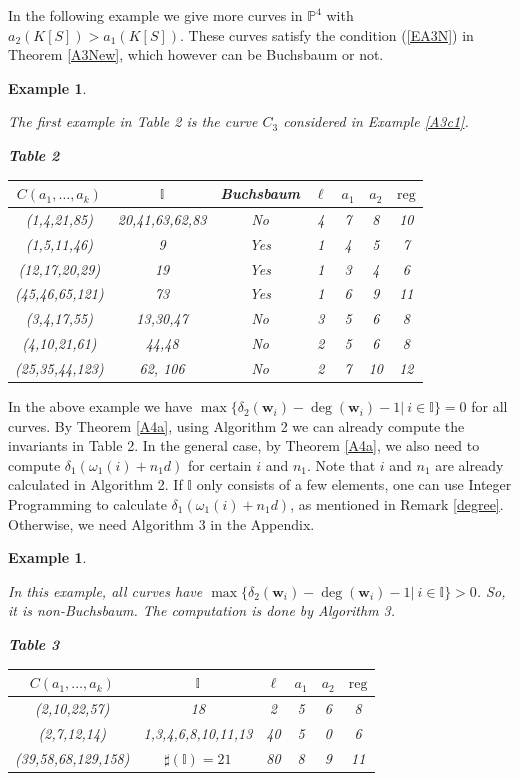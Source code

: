 \documentclass[11pt]{article}
\newtheorem{Example}[Theorem]{Example}
\def\deg{\operatorname{deg}}
\def\reg{\mathrm{reg}}
\def\wbf{{\mathbf w}}
\def\Pset{{\mathbb P}}
\def\Iset{{\mathbb I}}
\theoremstyle{remark}
\theoremstyle{definition}
\begin{document}
In the following example we give more curves in $\Pset^4$ with $ a_2(K[S]) > a_1(K[S])  $. These curves satisfy the condition (\ref{EA3N}) in Theorem \ref{A3New}, which  however can be  Buchsbaum or not.

\begin{Example} \label{ExAl2} {\rm 
The first example in Table 2 is the curve $C_3$ considered in Example \ref{A3c1}.

\centering \textbf{Table 2}
\begin{center} 

    \begin{tabular}{|c|c|c|c|c|c|c|}
\hline
$C(a_1,\ldots,a_k)$ & $\Iset$ & Buchsbaum& $\ell$ & $a_1$ & $a_2$ &$\reg$ \\
\hline
(1,4,21,85) & 20,41,63,62,83& No & 4 & 7 & 8 &10\\
(1,5,11,46)& 9 & Yes & 1 & 4 & 5 & 7\\
(12,17,20,29) & 19& Yes & 1& 3 & 4 & 6\\
(45,46,65,121)& 73&  Yes& 1 & 6 & 9 & 11\\
(3,4,17,55) & 13,30,47 & No & 3 & 5 & 6 & 8\\
(4,10,21,61) & 44,48 & No &  2 & 5 & 6 & 8\\
(25,35,44,123) & 62, 106& No & 2 & 7 & 10 & 12\\
\hline
\end{tabular}
\end{center}
 }
 \end{Example}

In the above example we have $ \max\{ \delta_2(\wbf_i)- \deg(\wbf_i) -1|\ i\in \Iset\} = 0$ for all curves. By Theorem \ref{A4a}, using  Algorithm 2 we can already compute the invariants in Table 2. In the general case, by Theorem \ref{A4a}, we also need to compute $\delta_1(\omega_1(i) + n_1d)$ for certain $i$ and $n_1$. Note that $i$ and $n_1$ are already calculated in Algorithm 2. If $\Iset$ only consists of a few elements, one can use Integer Programming to calculate   $\delta_1(\omega_1(i) + n_1d)$, as mentioned in Remark \ref{degree}. Otherwise, we need  Algorithm 3 in the Appendix.

 \begin{Example} \label{ExAl3} {\rm
In this example, all curves have $ \max\{ \delta_2(\wbf_i)- \deg(\wbf_i) -1|\ i\in \Iset\} > 0$. So, it is non-Buchsbaum. The computation is done by Algorithm 3. 

\centering \textbf{Table 3}
\begin{center} 
    \begin{tabular}{|c|c|c|c|c|c|}
\hline
$C(a_1,\ldots,a_k)$ & $\Iset$ &  $\ell$ & $a_1$ & $a_2$ &$\reg$\\
 \hline
 (2,10,22,57) & 18& 2 & 5& 6 & 8\\
 (2,7,12,14)& 1,3,4,6,8,10,11,13 & 40& 5& 0 & 6\\
 (39,58,68,129,158)& $\sharp(\Iset)= 21$& 80 & 8& 9 &11\\
\hline
\end{tabular}
\end{center}}
\end{Example}
\end{document}
